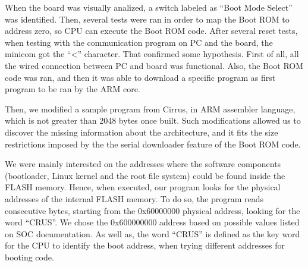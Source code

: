\documentclass[conference]{IEEEtran}
\newcommand{\nota}[1]{}
\begin{document}
\nota{En nuestras pruebas logramos obtener 
el caracter ``\textgreater'' desde el programa de comunicación minicom,
por lo que pudimos confirmar varias hipótesis. En principio
toda la conexión física entre la placa ENTC-1000 y nuestra PC era funcional.
También a nivel de comunicación vía software.}

When the board was visually analized, a switch  labeled as ``Boot Mode Select'' was identified. Then, several tests were ran in order to map the Boot ROM to address zero, so CPU can execute the Boot ROM code. After several reset tests, when testing with the communication program on PC and the board, the minicom got the ``\textless'' character. That confirmed some hypothesis. First of all, all the wired connection between PC and board was functional. Also, the Boot ROM code was ran, and then it was able to download a specific program as first program to be ran by the ARM core.


\nota{Posteriormente, preparamos un pequeño programa en lenguaje ensamblador que no supere
los 2048 bytes, y que nos permita ejecutar instrucciones en la CPU del 
ENTC-1000. Tomamos como base un ejemplo publicado por Cirrus, y lo modificamos
para realizar las pruebas con respecto a la información que
nos faltaba por conocer.}

Then, we modified a sample program from Cirrus, in ARM assembler language,
which is not greater than 2048 bytes once built. Such modifications
allowed us to discover the missing information about the architecture, and
it fits the size restrictions imposed by the the serial downloader feature
of the Boot ROM code.

\nota{En particular, hicimos que nuestro pequeño programa encontrara
la dirección física de la memoria FLASH interna.
El interés por encontrar esta dirección
base, es porque en esta memoria residen los componentes de software: 
gestor de arranque, el kernel Linux, y el sistemas de archivos raíz.}

We were mainly interested on the addresses where the software components
(bootloader, Linux kernel and the root file system) could be found inside the
FLASH memory. Hence, when executed, our program looks for the physical 
addresses of the internal FLASH memory. To do so, the program reads consecutive
bytes, starting from the 0x60000000 physical address, looking for the word ``CRUS''.
We chose the 0x600000000 address based on possible values listed on SOC documentation.
As well as, the word ``CRUS'' is defined as the key word for the CPU to identify 
the boot address, when trying different addresses for booting code.
\end{document}
